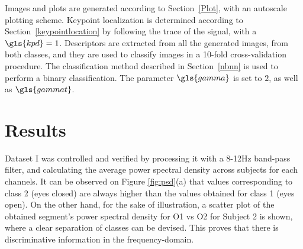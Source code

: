 Images and plots are generated according to Section~\ref{Plot}, with an autoscale plotting scheme.  Keypoint localization is determined according to Section~\ref{keypointlocation} by following the trace of the signal, with a $\gls{kpd} = 1$.   Descriptors are extracted from all the generated images, from both classes, and they are used to classify images in a 10-fold cross-validation procedure.  The classification method described in Section~\ref{nbnn} is used to perform a binary classification.  The parameter $\gls{gamma}$ is set to $2$, as well as $\gls{gammat}$.  


%

\section{Results}

Dataset I was controlled and verified by processing it with a 8-12Hz band-pass filter, and calculating the average power spectral density across subjects for each channels.  It can be observed on Figure \ref{fig:psd}(a)  that values corresponding to class 2 (eyes closed) are always higher than the values obtained for class 1 (eyes open). On the other hand, for the sake of illustration, a scatter plot of the obtained segment's power spectral density for O1 vs O2 for Subject 2 is shown, where a clear separation of classes can be devised.  This proves that there is discriminative information in the frequency-domain.



